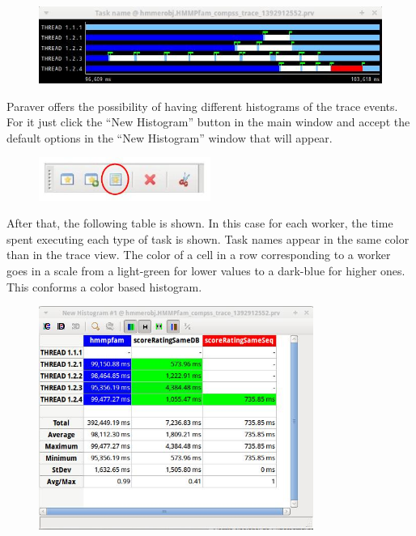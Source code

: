 \begin{figure}[ht!]
  \centering
    \includegraphics[width=1.0\textwidth]{./Sections/7_Tracing/Figures/11.jpeg}
\end{figure} 
 
Paraver offers the possibility of having different histograms of the trace events. 
For it just click the ``New Histogram'' button in the main window and accept the 
default options in the ``New Histogram'' window that will appear.

\begin{figure}[ht!]
  \centering
    \includegraphics[width=0.5\textwidth]{./Sections/7_Tracing/Figures/12.jpeg}
\end{figure}

After that, the following table is shown. In this case for each worker, the time spent 
executing each type of task is shown. Task names appear in the same color than in the 
trace view. The color of a cell in a row corresponding to a worker goes in a scale from 
a light-green for lower values to a dark-blue for higher ones. This conforms a color based histogram.

\begin{figure}[ht!]
  \centering
    \includegraphics[width=0.8\textwidth]{./Sections/7_Tracing/Figures/13.jpeg}
\end{figure}
 
